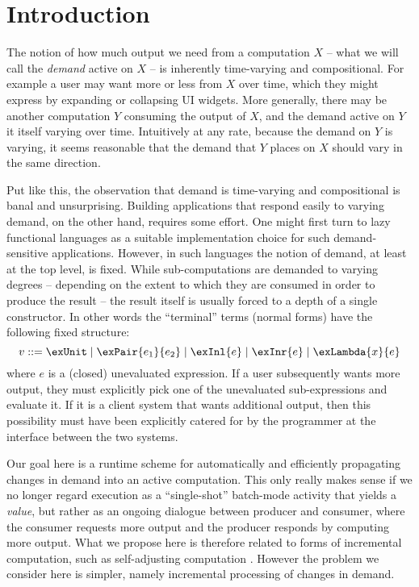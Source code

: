 \section{Introduction}

The notion of how much output we need from a computation $X$ -- what we
will call the \emph{demand} active on $X$ -- is inherently time-varying
and compositional. For example a user may want more or less from $X$
over time, which they might express by expanding or collapsing UI
widgets. More generally, there may be another computation $Y$ consuming
the output of $X$, and the demand active on $Y$ it itself varying over
time. Intuitively at any rate, because the demand on $Y$ is varying, it
seems reasonable that the demand that $Y$ places on $X$ should vary in
the same direction.

Put like this, the observation that demand is time-varying and
compositional is banal and unsurprising. Building applications that
respond easily to varying demand, on the other hand, requires some
effort. One might first turn to lazy functional languages as a suitable
implementation choice for such demand-sensitive applications. However,
in such languages the notion of demand, at least at the top level, is
fixed. While sub-computations are demanded to varying degrees --
depending on the extent to which they are consumed in order to produce
the result -- the result itself is usually forced to a depth of a single
constructor. In other words the ``terminal'' terms (normal forms) have
the following fixed structure:
\[v ::= \exUnit \mid \exPair{e_1}{e_2} \mid \exInl{e} \mid \exInr{e} \mid \exLambda{x}{e} \]
where $e$ is a (closed) unevaluated expression. If a user subsequently
wants more output, they must explicitly pick one of the unevaluated
sub-expressions and evaluate it. If it is a client system that wants
additional output, then this possibility must have been explicitly
catered for by the programmer at the interface between the two systems.

Our goal here is a runtime scheme for automatically and efficiently
propagating changes in demand into an active computation. This only
really makes sense if we no longer regard execution as a ``single-shot''
batch-mode activity that yields a \emph{value}, but rather as an ongoing
dialogue between producer and consumer, where the consumer requests more
output and the producer responds by computing more output. What we
propose here is therefore related to forms of incremental computation,
such as self-adjusting computation \cite{acar05}. However the problem we
consider here is simpler, namely incremental processing of changes in
demand.

